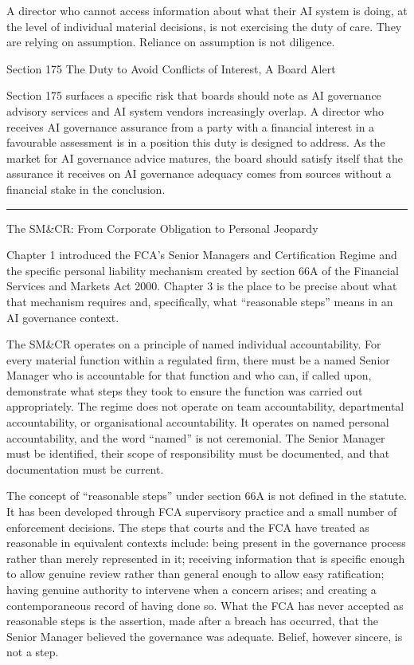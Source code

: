 A director who cannot access information about what their AI system is doing, at the level of individual material decisions, is not exercising the duty of care. They are relying on assumption. Reliance on assumption is not diligence.

Section 175 The Duty to Avoid Conflicts of Interest, A Board Alert

Section 175 surfaces a specific risk that boards should note as AI governance advisory services and AI system vendors increasingly overlap. A director who receives AI governance assurance from a party with a financial interest in a favourable assessment is in a position this duty is designed to address. As the market for AI governance advice matures, the board should satisfy itself that the assurance it receives on AI governance adequacy comes from sources without a financial stake in the conclusion.

\begin{center}\rule{0.5\linewidth}{0.5pt}\end{center}

The SM\&CR: From Corporate Obligation to Personal Jeopardy

Chapter 1 introduced the FCA's Senior Managers and Certification Regime and the specific personal liability mechanism created by section 66A of the Financial Services and Markets Act 2000. Chapter 3 is the place to be precise about what that mechanism requires and, specifically, what ``reasonable steps'' means in an AI governance context.

The SM\&CR operates on a principle of named individual accountability. For every material function within a regulated firm, there must be a named Senior Manager who is accountable for that function and who can, if called upon, demonstrate what steps they took to ensure the function was carried out appropriately. The regime does not operate on team accountability, departmental accountability, or organisational accountability. It operates on named personal accountability, and the word ``named'' is not ceremonial. The Senior Manager must be identified, their scope of responsibility must be documented, and that documentation must be current.

The concept of ``reasonable steps'' under section 66A is not defined in the statute. It has been developed through FCA supervisory practice and a small number of enforcement decisions. The steps that courts and the FCA have treated as reasonable in equivalent contexts include: being present in the governance process rather than merely represented in it; receiving information that is specific enough to allow genuine review rather than general enough to allow easy ratification; having genuine authority to intervene when a concern arises; and creating a contemporaneous record of having done so. What the FCA has never accepted as reasonable steps is the assertion, made after a breach has occurred, that the Senior Manager believed the governance was adequate. Belief, however sincere, is not a step.

